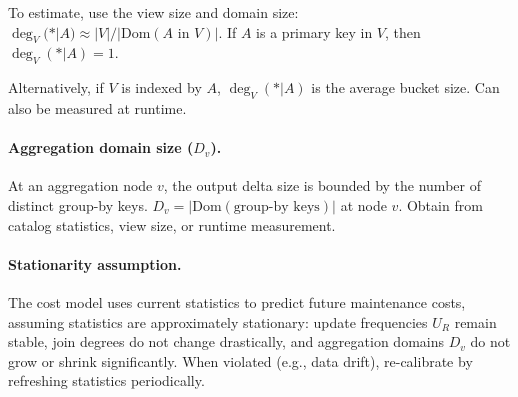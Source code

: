 \documentclass[11pt]{article}
\renewcommand{\deg}{\operatorname{deg}}
\begin{document}
To estimate, use the view size and domain size:
$\deg_V(*|A) \approx |V| / |\mathrm{Dom}(A \text{ in } V)|$.
If $A$ is a primary key in $V$, then $\deg_V(*|A) = 1$.

Alternatively, if $V$ is indexed by $A$, $\deg_V(*|A)$ is the average bucket size.
Can also be measured at runtime.

\paragraph{Aggregation domain size ($D_v$).}
At an aggregation node $v$, the output delta size is bounded by the number of distinct group-by keys.
$D_v = |\mathrm{Dom}(\text{group-by keys})|$ at node $v$.
Obtain from catalog statistics, view size, or runtime measurement.

\paragraph{Stationarity assumption.}
The cost model uses current statistics to predict future maintenance costs, assuming statistics are approximately stationary: update frequencies $U_R$ remain stable, join degrees do not change drastically, and aggregation domains $D_v$ do not grow or shrink significantly.
When violated (e.g., data drift), re-calibrate by refreshing statistics periodically.


\end{document}
